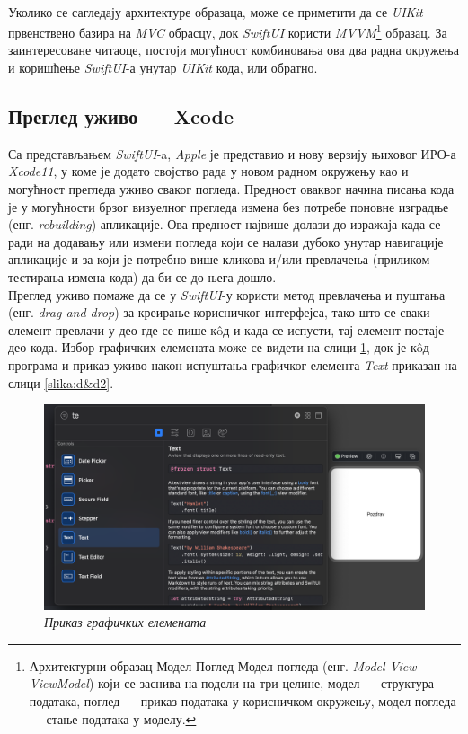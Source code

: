 \documentclass[12pt,oneside]{memoir}
\begin{document}
\\
\indent Уколико се сагледају архитектуре образаца, може се приметити да се \textit{UIKit} првенствено базира на \textit{MVC} обрасцу, док \textit{SwiftUI} користи \textit{MVVM}\footnote{Архитектурни образац Модел-Поглед-Модел погледа (енг. \textit{Model-View-ViewModel}) који се заснива на подели на три целине, модел --- структура података, поглед --- приказ података у корисничком окружењу, модел погледа --- стање података у моделу.} образац. За заинтересоване читаоце, постоји могућност комбиновања ова два радна окружења и коришћење \textit{SwiftUI}-а унутар \textit{UIKit} кода, или обратно.

\subsection{Преглед уживо --- Xcode}
\label{subsec:Xcode - преглед уживо}

\indent Са представљањем \textit{SwiftUI}-a, \textit{Apple} је представио и нову верзију њиховог ИРО-а \textit{Xcode11}, у коме је додато својство рада у новом радном окружењу као и могућност прегледа уживо сваког погледа. Предност оваквог начина писања кода је у могућности брзог визуелног прегледа измена без потребе поновне изградње (енг. \textit{rebuilding}) апликације. Ова предност највише долази до изражаја када се ради на додавању или измени погледа који се налази дубоко унутар навигације апликације и за који је потребно више кликова и/или превлачења (приликом тестирања измена кода) да би се до њега дошло. 
\\
\indent Преглед уживо помаже да се у \textit{SwiftUI}-у користи метод превлачења и пуштања (енг. \textit{drag and drop}) за креирање корисничког интерфејса, тако што се сваки елемент превлачи у део где се пише к\^{o}д и када се испусти, тај елемент постаје део кода. Избор графичких елемената може се видети на слици \ref{slika:d&d1}, док је к\^{o}д програма и приказ уживо након испуштања графичког елемента \textit{Text} приказан на слици \ref{slika:d&d2}.

\begin{figure}[H]
\includegraphics[width=1\textwidth]{images/Drag_and_drop_1.png}
\centering
\caption{\textit{Приказ графичких елемената}}
\label{slika:d&d1}
\end{figure}
\end{document}
